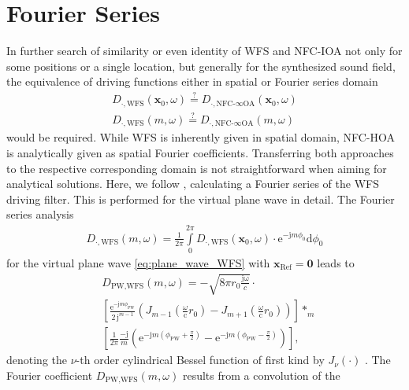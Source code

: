\documentclass[a4paper, 10pt, twocolumn]{article}
\begin{document}
\section*{Fourier Series}
\label{sec:fourier}
\noindent\hspace*{2mm} In further search of similarity or even identity of WFS and NFC-IOA not only for 
some positions or a single location, but generally for the synthesized sound field,
the equivalence of driving functions either in spatial or Fourier series domain
\begin{align}
D_{\cdot,\text{WFS}}(\mathbf{x}_0,\omega) \stackrel{?}=  D_{\cdot,\text{NFC-}\infty\text{OA}}(\mathbf{x}_0,\omega)\nonumber\\
D_{\cdot,\text{WFS}}(m,\omega) \stackrel{?}= D_{\cdot,\text{NFC-}\infty\text{OA}}(m,\omega)\nonumber
\end{align}
would be required.
While WFS is inherently given in spatial domain, NFC-HOA is analytically given 
as spatial Fourier coefficients.
Transferring both approaches to the respective corresponding domain is not 
straightforward when aiming for analytical solutions.
Here, we follow \cite[Ch. 4.4.2]{AhrensBook}, calculating a Fourier series of
the WFS driving filter.
This is performed for the virtual plane wave in detail.
The Fourier series analysis \cite[(1.84)]{NIST}
\begin{align}
D_{\cdot,\text{WFS}}(m,\omega) = 
\frac{1}{2 \pi}
\int\limits_0^{2 \pi} D_{\cdot,\text{WFS}}(\mathbf{x}_0,\omega) \cdot \mathrm{e}^{- \mathrm{j} m \phi_0 } \mathrm{d} \phi_0 
\end{align}
for the virtual plane wave \eqref{eq:plane_wave_WFS} with $\mathbf{x}_\text{Ref}=\mathbf{0}$ leads to
\cite{Schultz2019}
\begin{align}
\label{eq:WFS_FS_Conv}
&D_{\text{PW,WFS}}(m,\omega) = 
-\sqrt{8 \pi r_0 \frac{\mathrm{j \omega}}{c}} \cdot\nonumber\\
&\left[\frac{\mathrm{e}^{- \mathrm{j} m \phi_\text{PW}}}{2\,\mathrm{j}^{m-1}}
(J_{m-1}(\frac{\omega}{\mathrm{c}} r_0) - J_{m+1}(\frac{\omega}{\mathrm{c}} r_0))\right]
*_m\nonumber\\
&\left[\frac{1}{2 \pi} \frac{-\mathrm{j}}{m} (\mathrm{e}^{- \mathrm{j} m (\phi_\text{PW}+\frac{\pi}{2})}-\mathrm{e}^{- \mathrm{j} m (\phi_\text{PW}-\frac{\pi}{2}) })\right],
\end{align}
denoting the $\nu$-th order cylindrical Bessel function of first kind by $J_\nu(\cdot)$ \cite[Ch. 10]{NIST}.
%
The Fourier coefficient $D_{\text{PW,WFS}}(m,\omega)$ results from a convolution of the
\end{document}
